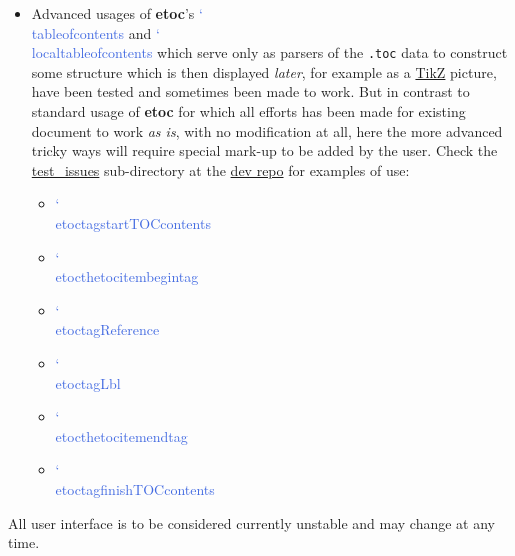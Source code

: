 \documentclass{article}
\DeclareRobustCommand\csa [1]
                {{\ttfamily\hyphenchar\font45 \char`\\ #1}}
\def\csb#1{\textcolor{RoyalBlue}{\csa{#1}}}
\newcommand\etoc{%
        \texorpdfstring{{\color{joli}\ttfamily\bfseries etoc}}{etoc}\xspace}
\newcommand\toc{\csb{tableofcontents}\xspace}
\newcommand\localtoc{\csb{localtableofcontents}\xspace}
\begin{document}
\begin{itemize}
\item Advanced usages of \etoc's \toc and \localtoc which serve only as
  parsers of the \texttt{.toc} data to construct some structure which is then
  displayed \emph{later}, for example as a
  \href{https://ctan.org/pkg/tikz}{TikZ} picture, have been tested and
  sometimes been made to work.  But in contrast to standard usage of \etoc for
  which all efforts has been made for existing document to work \emph{as is},
  with no modification at all, here the more advanced tricky ways will require
  special mark-up to be added by the user.  Check the
  \href{https://github.com/jfbu/etoc/test_issues}{test\_issues} sub-directory
  at the \href{https://github.com/jfbu/etoc}{dev repo} for examples of use:
  \begin{itemize}
    \item \csb{etoctagstartTOCcontents}
    \item \csb{etocthetocitembegintag}
    \item \csb{etoctagReference}
    \item \csb{etoctagLbl}
    \item \csb{etocthetocitemendtag}
    \item \csb{etoctagfinishTOCcontents}
  \end{itemize}
\end{itemize}

\begingroup{}
\begin{shaded}
  All user interface is to be considered currently unstable and may change at
any time.
\end{shaded}
\endgroup
\end{document}
